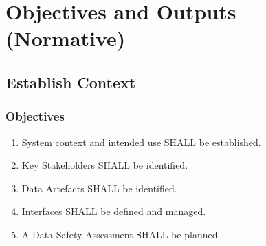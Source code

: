 %
%
\section{Objectives and Outputs (Normative)} \label{bkm:objectivesoutputs}


\subsection{Establish Context}
\subsubsection{Objectives}
\begin{enumerate}[label=\color{dsiwgAccentColour}{1-\arabic*}]
	\item System context and intended use SHALL be established.
	\item Key Stakeholders SHALL be identified.
	\item {}Data Artefacts SHALL be identified.
	\item Interfaces SHALL be defined and managed.
	\item A Data Safety Assessment SHALL be planned.
\end{enumerate}

